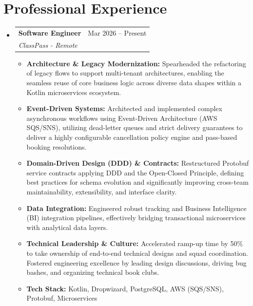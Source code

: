 \documentclass[letterpaper,11pt]{article}
\makeatletter
\newcommand{\resumeItem}[1]{
  \item\small{#1}
}
\newcommand{\resumeSubheading}[4]{
  \vspace{1pt}\item
    \begin{tabular*}{0.97\textwidth}[t]{l@{\extracolsep{\fill}}r}
      \textbf{#1} & #2 \\
      \textit{#3} & \textit{#4} \\
    \end{tabular*}\vspace{-4pt}
}
\makeatother
\begin{document}
\section{Professional Experience}
\begin{itemize}[leftmargin=0.15in, label={}]
    
    \resumeSubheading
        {Software Engineer}{Mar 2026 -- Present}
        {ClassPass - Remote}{}
        \begin{itemize}[leftmargin=0.25in, label=\textbullet, itemsep=2pt]
            \resumeItem{\textbf{Architecture \& Legacy Modernization:} Spearheaded the refactoring of legacy flows to support multi-tenant architectures, enabling the seamless reuse of core business logic across diverse data shapes within a Kotlin microservices ecosystem.}
            \resumeItem{\textbf{Event-Driven Systems:} Architected and implemented complex asynchronous workflows using Event-Driven Architecture (AWS SQS/SNS), utilizing dead-letter queues and strict delivery guarantees to deliver a highly configurable cancellation policy engine and pass-based booking resolutions.}
            \resumeItem{\textbf{Domain-Driven Design (DDD) \& Contracts:} Restructured Protobuf service contracts applying DDD and the Open-Closed Principle, defining best practices for schema evolution and significantly improving cross-team maintainability, extensibility, and interface clarity.}
            \resumeItem{\textbf{Data Integration:} Engineered robust tracking and Business Intelligence (BI) integration pipelines, effectively bridging transactional microservices with analytical data layers.}
            \resumeItem{\textbf{Technical Leadership \& Culture:} Accelerated ramp-up time by 50\% to take ownership of end-to-end technical designs and squad coordination. Fostered engineering excellence by leading design discussions, driving bug bashes, and organizing technical book clubs.}
            \resumeItem{\textbf{Tech Stack:} Kotlin, Dropwizard, PostgreSQL, AWS (SQS/SNS), Protobuf, Microservices}
        \end{itemize}


\end{itemize}
\end{document}
